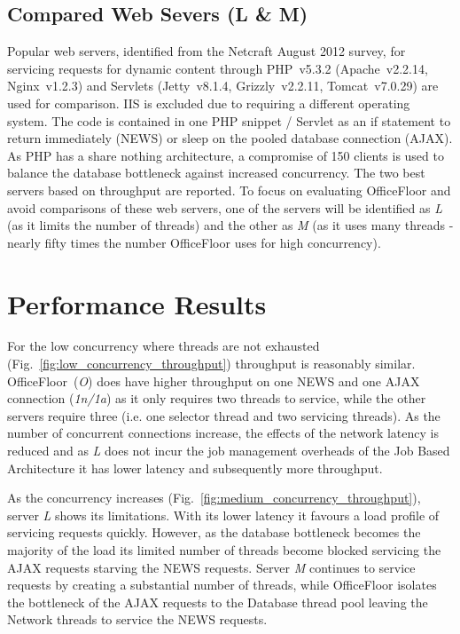 \documentclass[conference]{ieee/IEEEtran}
\begin{document}
\subsection{Compared Web Severs (L \& M)}
Popular web servers, identified from the Netcraft August 2012 survey, for
servicing requests for dynamic content through PHP~v5.3.2 (Apache~v2.2.14,
Nginx~v1.2.3) and Servlets (Jetty~v8.1.4, Grizzly~v2.2.11, Tomcat~v7.0.29) are
used for comparison.  IIS is excluded due to requiring a different operating
system.  The code is contained in one PHP snippet / Servlet as an if statement
to return immediately (NEWS) or sleep on the pooled database connection (AJAX).
As PHP has a share nothing architecture, a compromise of 150 clients is used to
balance the database bottleneck against increased concurrency.  The two best
servers based on throughput are reported.  To focus on evaluating OfficeFloor
and avoid comparisons of these web servers, one of the servers will be
identified as \textit{L} (as it limits the number of threads) and the other as
\textit{M} (as it uses many threads - nearly fifty times the number OfficeFloor
uses for high concurrency).



\section{Performance Results}
For the low concurrency where threads are not exhausted
(Fig.~\ref{fig:low_concurrency_throughput}) throughput is reasonably similar.
OfficeFloor~(\textit{O}) does have higher throughput on one NEWS and one AJAX
connection (\textit{1n/1a}) as it only requires two threads to service, while
the other servers require three (i.e. one selector thread and two servicing
threads).  As the number of concurrent connections increase, the effects of the
network latency is reduced and as \textit{L} does not incur the job management
overheads of the Job Based Architecture it has lower latency and subsequently
more throughput.

As the concurrency increases (Fig.~\ref{fig:medium_concurrency_throughput}),
server \textit{L} shows its limitations.  With its lower latency it favours a
load profile of servicing requests quickly.  However, as the database bottleneck
becomes the majority of the load its limited number of threads become blocked
servicing the AJAX requests starving the NEWS requests.  Server \textit{M}
continues to service requests by creating a substantial number of threads, while
OfficeFloor isolates the bottleneck of the AJAX requests to the Database thread
pool leaving the Network threads to service the NEWS requests.
\end{document}
